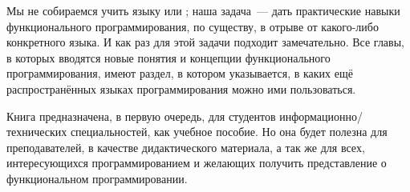 Мы не собираемся учить языку \Racket или ; наша задача~--- дать практические навыки функционального программирования, по существу, в отрыве от какого-либо конкретного языка. И как раз для этой задачи \Racket подходит замечательно. Все главы, в которых вводятся новые понятия и концепции функционального программирования, имеют раздел, в котором указывается, в каких ещё распространённых языках программирования можно ими пользоваться.

Книга предназначена, в первую очередь, для студентов информационно\-/технических специальностей, как учебное пособие. Но она будет полезна для преподавателей, в качестве дидактического материала, а так же для всех, интересующихся программированием и желающих получить представление о функциональном программировании.